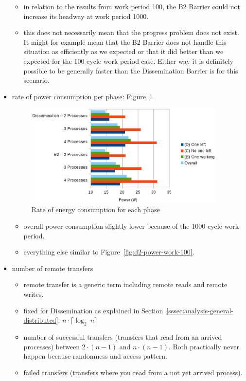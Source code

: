 \documentclass[a4paper, 10pt]{article}
\begin{document}
\begin{itemize}
\begin{itemize}
			\item in relation to the results from work period 100, the B2 Barrier could not increase its headway at work period 1000.
			\item this does not necessarily mean that the progress problem does not exist. It might for example mean that the B2 Barrier does not handle this situation as efficiently as we expected or that it did better than we expected for the 100 cycle work period case. Either way it is definitely possible to be generally faster than the Dissemination Barrier is for this scenario.
		\end{itemize}
	\item rate of power consumption per phase: Figure~\ref{fig:d2-power-work-1000}
		\begin{figure}[htbp]
			\centering
			\includegraphics[width=10cm]{charts/d2-power-work-1000}
			\caption{Rate of energy consumption for each phase}
			\label{fig:d2-power-work-1000}
		\end{figure}
		\begin{itemize}
			\item overall power consumption slightly lower because of the 1000 cycle work period.
			\item everything else similar to Figure~\ref{fig:d2-power-work-100}.
		\end{itemize}
	\item number of remote transfers
		\begin{itemize}
			\item remote transfer is a generic term including remote reads and remote writes.
			\item fixed for Dissemination as explained in Section~\ref{sssec:analysis-general-distributed}. $n \cdot \lceil \log _2~n \rceil$
			\item number of successful transfers (transfers that read from an arrived processes) between $2 \cdot (n-1)$ and $n \cdot (n-1)$. Both practically never happen because randomness and access pattern.
			\item failed transfers (transfers where you read from a not yet arrived process).

\end{itemize}
\end{itemize}
\end{document}
